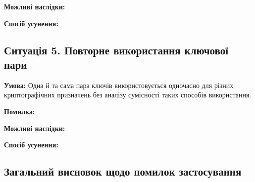 \textbf{Можливі наслідки:}

\textbf{Спосіб усунення:}

\subsection{Ситуація 5. Повторне використання ключової пари}

\textbf{Умова:} Одна й та сама пара ключів використовується одночасно для різних криптографічних призначень без аналізу сумісності таких способів використання.

\textbf{Помилка:}

\textbf{Можливі наслідки:}

\textbf{Спосіб усунення:}

\subsection{Загальний висновок щодо помилок застосування}